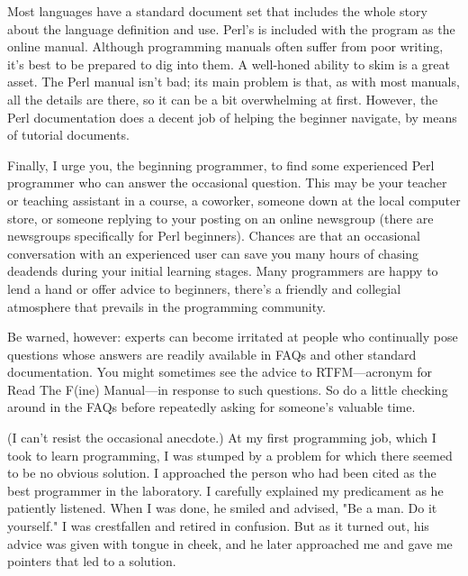 Most languages have a standard document set that includes the whole story about the language definition and use. Perl's is included with the program as the online manual. Although programming manuals often suffer from poor writing, it's best to be prepared to dig into them. A well-honed ability to skim is a great asset. The Perl manual isn't bad; its main problem is that, as with most manuals, all the details are there, so it can be a bit overwhelming at first. However, the Perl documentation does a decent job of helping the beginner navigate, by means of tutorial documents.

Finally, I urge you, the beginning programmer, to find some experienced Perl programmer who can answer the occasional question. This may be your teacher or teaching assistant in a course, a coworker, someone down at the local computer store, or someone replying to your posting on an online newsgroup (there are newsgroups specifically for Perl beginners). Chances are that an occasional conversation with an experienced user can save you many hours of chasing deadends during your initial learning stages. Many programmers are happy to lend a hand or offer advice to beginners, there's a friendly and collegial atmosphere that prevails in the programming community.

Be warned, however: experts can become irritated at people who continually pose questions whose answers are readily available in FAQs and other standard documentation. You might sometimes see the advice to RTFM—acronym for Read The F(ine) Manual—in response to such questions. So do a little checking around in the FAQs before repeatedly asking for someone's valuable time.

(I can't resist the occasional anecdote.) At my first programming job, which I took to learn programming, I was stumped by a problem for which there seemed to be no obvious solution. I approached the person who had been cited as the best programmer in the laboratory. I carefully explained my predicament as he patiently listened. When I was done, he smiled and advised, "Be a man. Do it yourself." I was crestfallen and retired in confusion. But as it turned out, his advice was given with tongue in cheek, and he later approached me and gave me pointers that led to a solution. 
